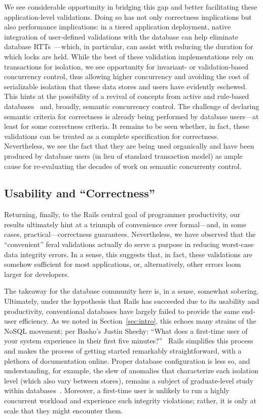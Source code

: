 We see considerable opportunity in bridging this gap and better
facilitating these application-level validations. Doing so has not
only correctness implications but also performance implications: in a
tiered application deployment, native integration of user-defined
validations with the database can help eliminate database
RTTs~\cite{pyxis}---which, in particular, can assist with reducing the
duration for which locks are held. While the best of these validation
implementations rely on transactions for isolation, we see opportunity
for invariant- or validation-based concurrency control, thus allowing
higher concurrency and avoiding the cost of serializable isolation
that these data stores and users have evidently eschewed. This hints
at the possibility of a revival of concepts from active and rule-based
databases~\cite{activedb-book} and, broadly, semantic concurrency
control. The challenge of declaring semantic criteria for correctness
is already being performed by database users---at least for some
correctness criteria. It remains to be seen whether, in fact, these
validations can be treated as a complete specification for
correctness. Nevertheless, we see the fact that they are being used
organically and have been produced by database users (in lieu of
standard transaction model) as ample cause for re-evaluating the
decades of work on semantic concurrenty control.

\subsection{Usability and ``Correctness''}

Returning, finally, to the Rails central goal of programmer
productivity, our results ultimately hint at a triumph of convenience
over formal---and, in some cases, practical---correctness
guarantees. Nevertheless, we have observed that the ``convenient''
feral validations actually do serve a purpose in reducing worst-case
data integrity errors. In a sense, this suggests that, in fact, these
validations are somehow sufficient for most applications, or,
alternatively, other errors loom larger for developers.

The takeaway for the database community here is, in a sense, somewhat
sobering. Ultimately, under the hypothesis that Rails has succeeded
due to its usability and productivity, conventional databases have
largely failed to provide the same end-user efficiency. As we noted in
Section~\ref{sec:intro}, this echoes many strains of the NoSQL
movement; per Basho's Justin Sheehy: ``What does a first-time user of
your system experience in their first five
minutes?''~\cite{marcus-talk} Rails simplifies this process and makes
the process of getting started remarkably straightforward, with a
plethora of documentation online. Proper database configuration is
less so, and understanding, for example, the slew of anomalies that
characterize each isolation level (which also vary between stores),
remains a subject of graduate-level study within
databases~\cite{adya-isolation,hat-vldb}. Moreover, a first-time user
is unlikely to run a highly concurrent workload and experience such
integrity violations; rather, it is only at scale that they might
encounter them.

